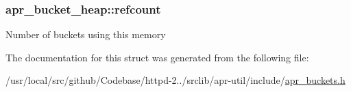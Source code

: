 \subsubsection[{\texorpdfstring{refcount}{refcount}}]{ apr\+\_\+bucket\+\_\+heap\+::refcount}\hypertarget{structapr__bucket__heap_ab87003dea25caef69aa3b30a1948024e}{}\label{structapr__bucket__heap_ab87003dea25caef69aa3b30a1948024e}
Number of buckets using this memory 

The documentation for this struct was generated from the following file\+:\begin{DoxyCompactItemize}
\item 
/usr/local/src/github/\+Codebase/httpd-\/2../srclib/apr-\/util/include/\hyperlink{apr__buckets_8h}{apr\+\_\+buckets.\+h}\end{DoxyCompactItemize}
